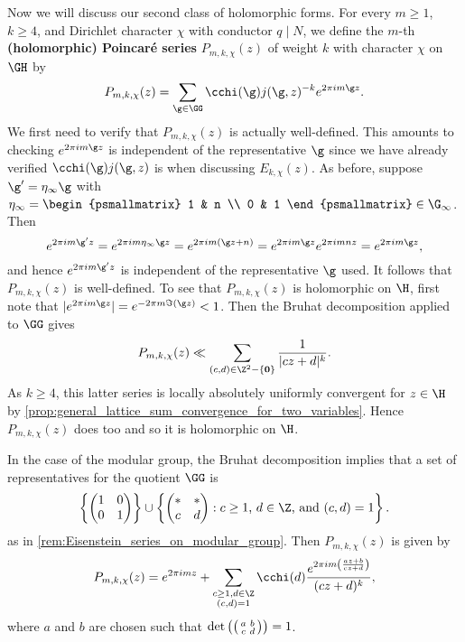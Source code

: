     Now we will discuss our second class of holomorphic forms. For every $m \ge 1$, $k \ge 4$, and Dirichlet character $\chi$ with conductor $q \mid N$, we define the $m$-th \textbf{(holomorphic) Poincar\'e series} $P_{m,k,\chi}(z)$ of weight $k$ with character $\chi$ on $\GH$ by
    \[
      P_{m,k,\chi}(z) = \sum_{\g \in \GG}\cchi(\g)j(\g,z)^{-k}e^{2\pi im\g z}.
    \]
    We first need to verify that $P_{m,k,\chi}(z)$ is actually well-defined. This amounts to checking $e^{2\pi im\g z}$ is independent of the representative $\g$ since we have already verified $\cchi(\g)j(\g,z)$ is when discussing $E_{k,\chi}(z)$. As before, suppose $\g' = \eta_{\infty}\g$ with $\eta_{\infty} = \begin{psmallmatrix} 1 & n \\ 0 & 1 \end{psmallmatrix} \in \G_{\infty}$. Then
    \[
      e^{2\pi im\g' z} = e^{2\pi im\eta_{\infty}\g z} = e^{2\pi im(\g z+n)} = e^{2\pi im\g z}e^{2\pi imnz} = e^{2\pi im\g z},
    \]
    and hence $e^{2\pi im\g' z}$ is independent of the representative $\g$ used. It follows that $P_{m,k,\chi}(z)$ is well-defined. To see that $P_{m,k,\chi}(z)$ is holomorphic on $\H$, first note that $|e^{2\pi im\g z}| = e^{-2\pi m\Im(\g z)} < 1$. Then the Bruhat decomposition applied to $\GG$ gives
    \[
      P_{m,k,\chi}(z) \ll \sum_{(c,d) \in \Z^{2}-\{\mathbf{0}\}}\frac{1}{|cz+d|^{k}}.
    \]
    As $k \ge 4$, this latter series is locally absolutely uniformly convergent for $z \in \H$ by \cref{prop:general_lattice_sum_convergence_for_two_variables}. Hence $P_{m,k,\chi}(z)$ does too and so it is holomorphic on $\H$.

    \begin{remark}
      In the case of the modular group, the Bruhat decomposition implies that a set of representatives for the quotient $\GG$ is
      \[
        \left\{\begin{pmatrix} 1 & 0 \\ 0 & 1 \end{pmatrix}\right\} \cup \left\{\begin{pmatrix} \ast & \ast \\ c & d \end{pmatrix}:\text{$c \ge 1$, $d \in \Z$, and $(c,d) = 1$}\right\}.
      \]
      as in \cref{rem:Eisenstein_series_on_modular_group}. Then $P_{m,k,\chi}(z)$ is given by
      \[
        P_{m,k,\chi}(z) = e^{2\pi imz}+\sum_{\substack{c \ge 1, d \in \Z \\ (c,d) = 1}}\cchi(d)\frac{e^{2\pi im\left(\frac{az+b}{cz+d}\right)}}{(cz+d)^{k}},
      \]
      where $a$ and $b$ are chosen such that $\det\left(\begin{psmallmatrix} a & b \\ c & d \end{psmallmatrix}\right) = 1$.
    \end{remark}

